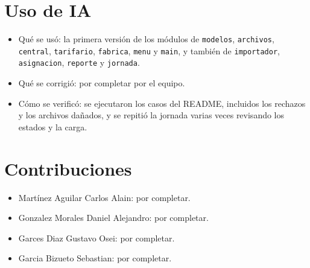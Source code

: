 \documentclass[11pt]{article}
\begin{document}
\section{Uso de IA}
\begin{itemize}
\item Qué se usó: la primera versión de los módulos de \texttt{modelos}, \texttt{archivos}, \texttt{central},
\texttt{tarifario}, \texttt{fabrica}, \texttt{menu} y \texttt{main}, y también de \texttt{importador}, \texttt{asignacion}, \texttt{reporte} y \texttt{jornada}.
\item Qué se corrigió: por completar por el equipo.
\item Cómo se verificó: se ejecutaron los casos del README, incluidos los rechazos y los archivos dañados, y se repitió
la jornada varias veces revisando los estados y la carga.
\end{itemize}

\section{Contribuciones}
\begin{itemize}
\item Martínez Aguilar Carlos Alain: por completar.
\item Gonzalez Morales Daniel Alejandro: por completar.
\item Garces Diaz Gustavo Osei: por completar.
\item Garcia Bizueto Sebastian: por completar.
\end{itemize}
\end{document}
